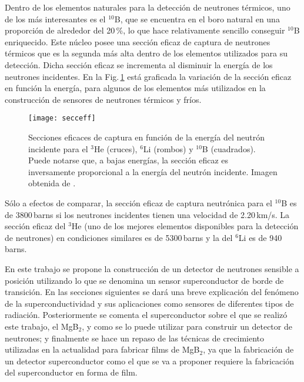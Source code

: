 Dentro de los elementos naturales para la detección de neutrones térmicos, uno de los más interesantes es el $^{10}$B\cite{knoll}, que se encuentra en el boro natural en una proporción de alrededor del 20\,\%, lo que hace relativamente sencillo conseguir $^{10}$B enriquecido. Este núcleo posee una sección eficaz de captura de neutrones térmicos que es la segunda más alta dentro de los elementos utilizados para su detección\cite{knoll}. Dicha sección eficaz se incrementa al disminuir la energía de los neutrones incidentes. En la Fig.\,\ref{fig:eficaz} está graficada la variación de la sección eficaz en función la energía, para algunos de los elementos más utilizados en la construcción de sensores de neutrones térmicos y fríos.
\begin{figure}[tbh!]
 \begin{center}
    \texttt{[image: secceff]}
  \end{center}
  \caption[Secciones eficaces de captura en función de la energía del neutrón incidente para el $^3$He, $^6$Li y $^{10}$B]{Secciones eficaces de captura en función de la energía del neutrón incidente para el $^3$He (cruces), $^6$Li (rombos) y $^{10}$B (cuadrados). Puede notarse que, a bajas energías, la sección eficaz es inversamente proporcional a la energía del neutrón incidente. Imagen obtenida de \cite{knoll}.}
\label{fig:eficaz}
\end{figure}

Sólo a efectos de comparar, la sección eficaz de captura neutrónica para el $^{10}$B es de 3800\,barns si los neutrones incidentes tienen una velocidad de 2.20\,km/s. La sección eficaz del $^3$He (uno de los mejores elementos disponibles para la detección de neutrones) en condiciones similares es de 5300\,barns y la del $^6$Li es de 940\,barns\cite{knoll}.

En este trabajo se propone la construcción de un detector de neutrones sensible a posición utilizando lo que se denomina un sensor superconductor de borde de transición. En las secciones siguientes se dará una breve explicación del fenómeno de la superconductividad y sus aplicaciones como sensores de diferentes tipos de radiación. Posteriormente se comenta el superconductor sobre el que se realizó este trabajo, el MgB$_{2}$, y como se lo puede utilizar para construir un detector de neutrones; y finalmente se hace un repaso de las técnicas de crecimiento utilizadas en la actualidad para fabricar films de MgB$_{2}$, ya que la fabricación de un detector superconductor como el que se va a proponer requiere la fabricación del superconductor en forma de film.  
